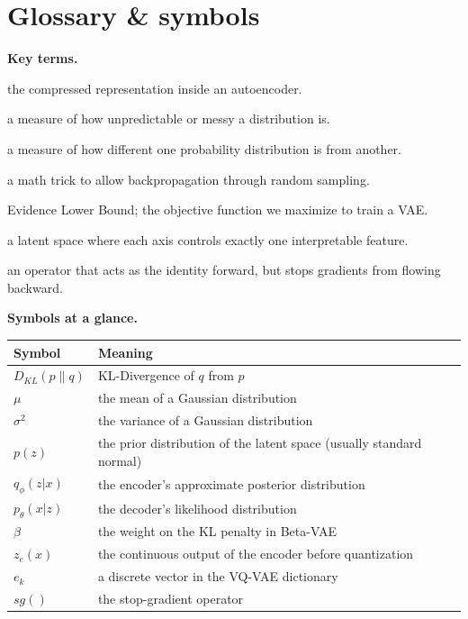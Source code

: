 \documentclass[a4paper,11pt]{article}
\begin{document}
\section*{Glossary \& symbols}
\noindent\textbf{Key terms.}
\begin{description}[leftmargin=8.5em,style=nextline,font=\normalfont\bfseries\color{navy}]
  \item[latent space] the compressed representation inside an autoencoder.
  \item[entropy] a measure of how unpredictable or messy a distribution is.
  \item[KL-Divergence] a measure of how different one probability distribution is from another.
  \item[reparameterization trick] a math trick to allow backpropagation through random sampling.
  \item[ELBO] Evidence Lower Bound; the objective function we maximize to train a VAE.
  \item[disentangled representation] a latent space where each axis controls exactly one interpretable feature.
  \item[stop-gradient] an operator that acts as the identity forward, but stops gradients from flowing backward.
\end{description}
\medskip
\noindent\textbf{Symbols at a glance.}
\begin{center}\small
\begin{tabular}{@{}ll@{}}
\toprule \textbf{Symbol} & \textbf{Meaning} \\ \midrule
$D_{KL}(p \parallel q)$ & KL-Divergence of $q$ from $p$ \\
$\mu$ & the mean of a Gaussian distribution \\
$\sigma^2$ & the variance of a Gaussian distribution \\
$p(z)$ & the prior distribution of the latent space (usually standard normal) \\
$q_\phi(z|x)$ & the encoder's approximate posterior distribution \\
$p_\theta(x|z)$ & the decoder's likelihood distribution \\
$\beta$ & the weight on the KL penalty in Beta-VAE \\
$z_e(x)$ & the continuous output of the encoder before quantization \\
$e_k$ & a discrete vector in the VQ-VAE dictionary \\
$sg()$ & the stop-gradient operator \\
\bottomrule
\end{tabular}
\end{center}
\end{document}
